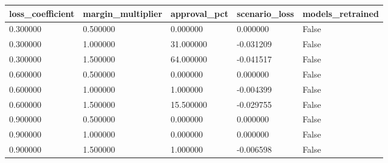 \begin{tabular}{lllll}
\hline
loss\_coefficient & margin\_multiplier & approval\_pct & scenario\_loss & models\_retrained \\
\hline
0.300000 & 0.500000 & 0.000000 & 0.000000 & False \\
0.300000 & 1.000000 & 31.000000 & -0.031209 & False \\
0.300000 & 1.500000 & 64.000000 & -0.041517 & False \\
0.600000 & 0.500000 & 0.000000 & 0.000000 & False \\
0.600000 & 1.000000 & 1.000000 & -0.004399 & False \\
0.600000 & 1.500000 & 15.500000 & -0.029755 & False \\
0.900000 & 0.500000 & 0.000000 & 0.000000 & False \\
0.900000 & 1.000000 & 0.000000 & 0.000000 & False \\
0.900000 & 1.500000 & 1.000000 & -0.006598 & False \\
\hline
\end{tabular}
